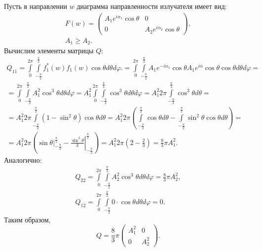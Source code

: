 Пусть в направлении $w$ диаграмма направленности излучателя имеет вид:
\begin{gather*}
    F(w)
    = \begin{pmatrix}
          A_1 e^{i \alpha_1} \cos \theta & 0                              \\
          0                              & A_2 e^{i \alpha_2} \cos \theta
    \end{pmatrix} , \\
    A_1 \ge A_2.
\end{gather*}
Вычислим элементы матрицы $Q$:
\begin{multline*}
    Q_{11}
    = \int \limits_0^{2 \pi} \int \limits_{-\frac{\pi}{2}}^\frac{\pi}{2} f_1^*(w) f_1(w) \cos \theta d\theta d\varphi .
    = \int \limits_0^{2 \pi} \int \limits_{-\frac{\pi}{2}}^\frac{\pi}{2} A_1 e^{-i \alpha_1} \cos \theta A_1 e^{i \alpha} \cos \theta \cos \theta d\theta d\varphi = \\
    = \int \limits_0^{2 \pi} \int \limits_{-\frac{\pi}{2}}^\frac{\pi}{2} A_1^2 \cos^3 \theta d\theta d\varphi
    = A_1^2 \int \limits_0^{2 \pi} \int \limits_{-\frac{\pi}{2}}^\frac{\pi}{2} \cos^3 \theta d\theta d\varphi
    = A_1^2 2 \pi \int \limits_{-\frac{\pi}{2}}^\frac{\pi}{2} \cos^3 \theta d\theta = \\
    = A_1^2 2 \pi \int \limits_{-\frac{\pi}{2}}^\frac{\pi}{2} (1 - \sin^2 \theta ) \cos \theta d\theta
    = A_1^2 2 \pi \left( \int \limits_{-\frac{\pi}{2}}^\frac{\pi}{2} \cos \theta d\theta - \int \limits_{-\frac{\pi}{2}}^\frac{\pi}{2} \sin^2 \theta \cos \theta d\theta \right) = \\
    = A_1^2 2 \pi \left( \left. \sin \theta \right|_{-\frac{\pi}{2}}^\frac{\pi}{2} - \left. \frac{\sin^3 \theta}{3} \right|_{-\frac{\pi}{2}}^\frac{\pi}{2} \right)
    = A_1^2 2 \pi \left( 2 - \frac{2}{3} \right)
    = \frac{8}{3} \pi A_1^2 .
\end{multline*}
Аналогично:
\begin{gather*}
    Q_{22}
    = \int \limits_0^{2 \pi} \int \limits_{-\frac{\pi}{2}}^\frac{\pi}{2} A_2^2 \cos^3 \theta d\theta d\varphi
    = \frac{8}{3} \pi A_2^2 , \\
    Q_{12}
    = \int \limits_0^{2 \pi} \int \limits_{-\frac{\pi}{2}}^\frac{\pi}{2} 0 \cdot \cos \theta d\theta d\varphi
    = 0 .
\end{gather*}
Таким образом,
\[
    Q
    = \frac{8}{3} \pi
    \begin{pmatrix}
        A_1^2 & 0     \\
        0     & A_2^2
    \end{pmatrix} .
\]
